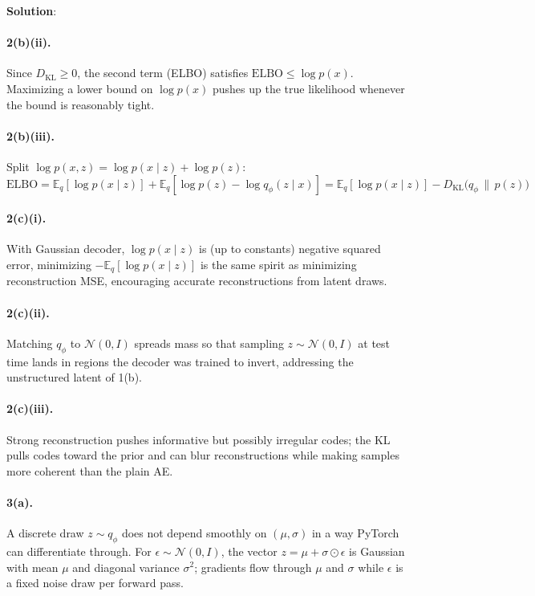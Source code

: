 \documentclass[submit]{../harvardml}
\newcommand{\E}{\mathbb{E}}
\newcommand{\KL}{D_{\mathrm{KL}}}
\newenvironment{solution}{
    \vspace{2mm}
    \color{blue}\noindent\textbf{Solution}:
}{}
\begin{document}
\begin{solution}
\paragraph{2(b)(ii).}
Since $\KL \geq 0$, the second term (ELBO) satisfies $\mathrm{ELBO} \leq \log p(x)$. Maximizing a lower bound on $\log p(x)$ pushes up the true likelihood whenever the bound is reasonably tight.

\paragraph{2(b)(iii).}
Split $\log p(x, z) = \log p(x \mid z) + \log p(z)$:
\[
  \mathrm{ELBO} = \E_q[\log p(x \mid z)] + \E_q[\log p(z) - \log q_\phi(z \mid x)]
  = \E_q[\log p(x \mid z)] - \KL\!\big(q_\phi \,\|\, p(z)\big)
\]

\paragraph{2(c)(i).}
With Gaussian decoder, $\log p(x \mid z)$ is (up to constants) negative squared error, minimizing $-\E_q[\log p(x \mid z)]$ is the same spirit as minimizing reconstruction MSE, encouraging accurate reconstructions from latent draws.

\paragraph{2(c)(ii).}
Matching $q_\phi$ to $\mathcal{N}(0, I)$ spreads mass so that sampling $z \sim \mathcal{N}(0, I)$ at test time lands in regions the decoder was trained to invert, addressing the unstructured latent of 1(b).

\paragraph{2(c)(iii).}
Strong reconstruction pushes informative but possibly irregular codes; the KL pulls codes toward the prior and can blur reconstructions while making samples more coherent than the plain AE.

\paragraph{3(a).}
A discrete draw $z \sim q_\phi$ does not depend smoothly on $(\mu, \sigma)$ in a way PyTorch can differentiate through. For $\epsilon \sim \mathcal{N}(0, I)$, the vector $z = \mu + \sigma \odot \epsilon$ is Gaussian with mean $\mu$ and diagonal variance $\sigma^2$; gradients flow through $\mu$ and $\sigma$ while $\epsilon$ is a fixed noise draw per forward pass.


\end{solution}
\end{document}

